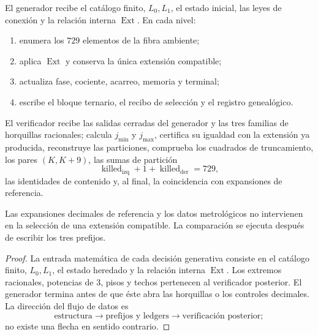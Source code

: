 \begin{definition}
El generador recibe el catálogo finito, \(L_0,L_1\), el estado inicial, las
leyes de conexión y la relación interna \(\operatorname{Ext}\). En cada nivel:
\begin{enumerate}
 \item enumera los \(729\) elementos de la fibra ambiente;
 \item aplica \(\operatorname{Ext}\) y conserva la única extensión compatible;
 \item actualiza fase, cociente, acarreo, memoria y terminal;
 \item escribe el bloque ternario, el recibo de selección y el registro genealógico.
\end{enumerate}
\end{definition}

\begin{definition}
El verificador recibe las salidas cerradas del generador y las tres familias
de horquillas racionales; calcula \(j_{\min}\) y \(j_{\max}\), certifica su
igualdad con la extensión ya producida, reconstruye las
particiones, comprueba los cuadrados de truncamiento, los pares
\((K,K+9)\), las sumas de partición
\[
 \operatorname{killed}_{\mathrm{izq}}+1+\operatorname{killed}_{\mathrm{der}}=729,
\]
las identidades de contenido y, al final, la coincidencia con expansiones de referencia.
\end{definition}

\begin{theorem}
\label{gfp:b:thm:aislamiento-datos-objetivo-precision}
Las expansiones decimales de referencia y los datos metrológicos no
intervienen en la selección de una extensión compatible. La comparación se
ejecuta después de escribir los tres prefijos.
\end{theorem}

\begin{proof}
La entrada matemática de cada decisión generativa consiste en el catálogo
finito, \(L_0,L_1\), el estado heredado y la relación interna
\(\operatorname{Ext}\). Los extremos racionales, potencias de \(3\), pisos y
techos pertenecen al verificador posterior. El generador termina antes de que
éste abra las horquillas o los controles decimales. La dirección del flujo de
datos es
\[
 \text{estructura}\longrightarrow
 \text{prefijos y ledgers}\longrightarrow
 \text{verificación posterior};
\]
no existe una flecha en sentido contrario.
\end{proof}

